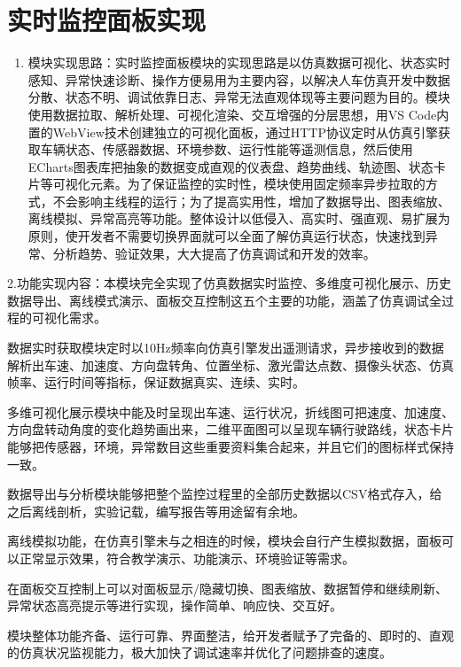 \section{实时监控面板实现}

\begin{enumerate}
\def\labelenumi{\arabic{enumi}.}
\item
  模块实现思路：实时监控面板模块的实现思路是以仿真数据可视化、状态实时感知、异常快速诊断、操作方便易用为主要内容，以解决人车仿真开发中数据分散、状态不明、调试依靠日志、异常无法直观体现等主要问题为目的。模块使用数据拉取、解析处理、可视化渲染、交互增强的分层思想，用VS
  Code内置的WebView技术创建独立的可视化面板，通过HTTP协议定时从仿真引擎获取车辆状态、传感器数据、环境参数、运行性能等遥测信息，然后使用ECharts图表库把抽象的数据变成直观的仪表盘、趋势曲线、轨迹图、状态卡片等可视化元素。为了保证监控的实时性，模块使用固定频率异步拉取的方式，不会影响主线程的运行；为了提高实用性，增加了数据导出、图表缩放、离线模拟、异常高亮等功能。整体设计以低侵入、高实时、强直观、易扩展为原则，使开发者不需要切换界面就可以全面了解仿真运行状态，快速找到异常、分析趋势、验证效果，大大提高了仿真调试和开发的效率。
\end{enumerate}

2.功能实现内容：本模块完全实现了仿真数据实时监控、多维度可视化展示、历史数据导出、离线模式演示、面板交互控制这五个主要的功能，涵盖了仿真调试全过程的可视化需求。

数据实时获取模块定时以10Hz频率向仿真引擎发出遥测请求，异步接收到的数据解析出车速、加速度、方向盘转角、位置坐标、激光雷达点数、摄像头状态、仿真帧率、运行时间等指标，保证数据真实、连续、实时。

多维可视化展示模块中能及时呈现出车速、运行状况，折线图可把速度、加速度、方向盘转动角度的变化趋势画出来，二维平面图可以呈现车辆行驶路线，状态卡片能够把传感器，环境，异常数目这些重要资料集合起来，并且它们的图标样式保持一致。

数据导出与分析模块能够把整个监控过程里的全部历史数据以CSV格式存入，给之后离线剖析，实验记载，编写报告等用途留有余地。

离线模拟功能，在仿真引擎未与之相连的时候，模块会自行产生模拟数据，面板可以正常显示效果，符合教学演示、功能演示、环境验证等需求。

在面板交互控制上可以对面板显示/隐藏切换、图表缩放、数据暂停和继续刷新、异常状态高亮提示等进行实现，操作简单、响应快、交互好。

模块整体功能齐备、运行可靠、界面整洁，给开发者赋予了完备的、即时的、直观的仿真状况监视能力，极大加快了调试速率并优化了问题排查的速度。

